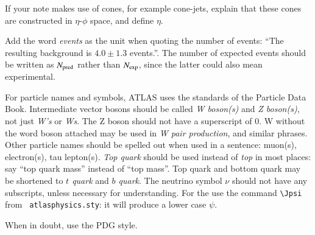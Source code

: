 \documentclass[11pt,a4paper]{../atlasnote}
\begin{document}
If your note makes use of cones, for example cone-jets, explain that
these cones are constructed in $\eta$-$\phi$ space, and define $\eta$.

Add the word \emph{events} as the unit when quoting the number of
events: ``The resulting background is $4.0 \pm 1.3$ events.''.  The
number of expected events should be written as $N_{\rm pred}$ rather
than $N_{\rm exp}$, since the latter could also mean experimental.

For particle names and symbols, ATLAS uses the standards of the
Particle Data Book. Intermediate vector bosons should be called
\emph{W boson(s)} and \emph{Z boson(s)}, not just \emph{W's} or
\emph{Ws}. The Z boson should not have a superscript of 0. W without
the word boson attached may be used in \emph{W pair production}, and
similar phrases.  Other particle names should be spelled out when used
in a sentence: muon(s), electron(s), tau lepton(s). \emph{Top quark}
should be used instead of \emph{top} in most places: say ``top quark
mass'' instead of ``top mass''.  Top quark and bottom quark may be
shortened to \emph{$t$ quark} and \emph{$b$ quark}. The neutrino
symbol $\nu$ should not have any subscripts, unless necessary for
understanding. For the \Jpsi{} use the command \verb+\Jpsi+ from {\tt
atlasphysics.sty}: it will produce a lower case $\psi$.

When in doubt, use the PDG style.
\end{document}
